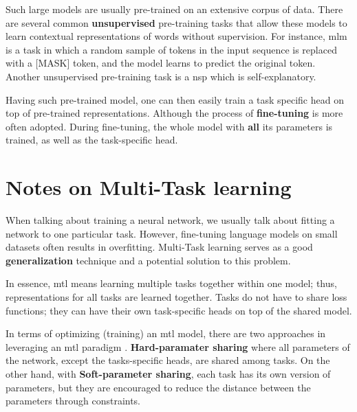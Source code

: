 Such large models are usually pre-trained on an extensive corpus of data. There are several common \textbf{unsupervised} pre-training tasks that allow these models to learn contextual representations of words without supervision. For instance, \gls{mlm} is a task in which a random sample of tokens in the input sequence is replaced with a [MASK] token, and the model learns to predict the original token. Another unsupervised pre-training task is a \gls{nsp} which is self-explanatory.

Having such pre-trained model, one can then easily train a task specific head on top of pre-trained representations. Although the process of \textbf{fine-tuning} is more often adopted. During fine-tuning, the whole model with \textbf{all} its parameters is trained, as well as the task-specific head.

\section{Notes on Multi-Task learning}
When talking about training a neural network, we usually talk about fitting a network to one particular task. However, fine-tuning language models on small datasets often results in overfitting. Multi-Task learning \cite{caruana1997multitask} serves as a good \textbf{generalization} technique and a potential solution to this problem.

In essence, \gls{mtl} means learning multiple tasks together within one model; thus, representations for all tasks are learned together. Tasks do not have to share loss functions; they can have their own task-specific heads on top of the shared model.

In terms of optimizing (training) an \gls{mtl} model, there are two approaches in leveraging an \gls{mtl} paradigm \cite{ruder2017overview}.
\textbf{Hard-paramater sharing} where all parameters of the network, except the tasks-specific heads, are shared among tasks. On the other hand, with \textbf{Soft-parameter sharing}, each task has its own version of parameters, but they are encouraged to reduce the distance between the parameters through constraints.